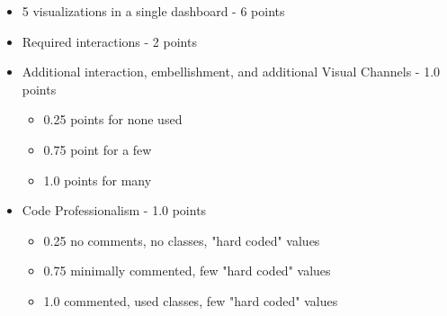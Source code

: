 \documentclass[a4paper,12pt]{article}
\begin{document}
\begin{itemize}
	\item 5 visualizations in a single dashboard - 6 points
	\item Required interactions - 2 points
	\item Additional interaction, embellishment, and additional Visual Channels - 1.0 points 
		\begin{itemize}
    		\item 0.25 points for none used
    		\item 0.75 point for a few
            \item 1.0 points for many
		\end{itemize}
	\item Code Professionalism - 1.0 points
		\begin{itemize}
            \item 0.25 no comments, no classes, "hard coded" values
            \item 0.75 minimally commented, few "hard coded" values
            \item 1.0 commented, used classes, few "hard coded" values
		\end{itemize}
\end{itemize}
\end{document}

